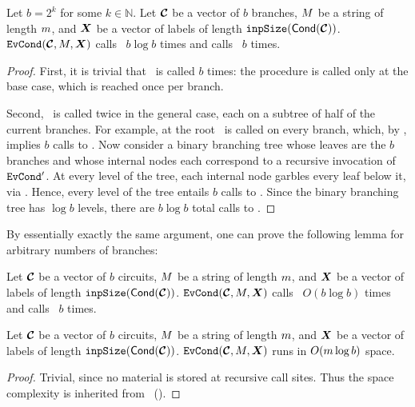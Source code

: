 \begin{lemma}\label{lemma:evcondtime}
  Let $b = 2^k$ for some $k \in \mathbb{N}$.
  Let $\vec{\cir}$ be a vector of $b$ branches, $M$ be a string of
  length $m$, and $\gcirinp$ be a vector of labels of length
  $\inpsize(\conditional(\vec{\cir}))$.
  $\evcond(\vec{\cir}, \mat, \gcirinp)$ calls \gGb\ $b \log b$ times
  and calls \gEv\ $b$ times.
\end{lemma}
\begin{proof}
  First, it is trivial that \gEv\ is called $b$ times: the
  procedure is called only at the base case, which is reached once per
  branch.

  Second, \gbtree\ is called twice in the general case, each on a
  subtree of half of the current branches.
  For example, at the root \gbtree\ is called on every branch, which, by
  , implies $b$ calls to \Gb.
  Now consider a binary branching tree whose leaves are the $b$
  branches and whose internal nodes each correspond to
  a recursive invocation of $\mathtt{EvCond}'$.
  At every level of the tree, each internal node garbles every
  leaf below it, via \gbtree.
  Hence, every level of the tree entails $b$ calls to \Gb.
  Since the binary branching tree has $\log b$ levels, there are $b
  \log b$ total calls to \Gb.
\end{proof}

By essentially exactly the same argument, one can prove the following
lemma for arbitrary numbers of branches:
\begin{lemma}\label{lemma:evcondtime-general}
  Let $\vec{\cir}$ be a vector of $b$ circuits, $M$ be a string of
  length $m$, and $\gcirinp$ be a vector of labels of length
  $\inpsize(\conditional(\vec{\cir}))$.
  $\evcond(\vec{\cir}, \mat, \gcirinp)$ calls \gGb\ $O(b \log b)$ times
  and calls \gEv\ $b$ times.
\end{lemma}

\begin{lemma}\label{lemma:evcondspace}
  Let $\vec{\cir}$ be a vector of $b$ circuits, $M$ be a string of
  length $m$, and $\gcirinp$ be a vector of labels of length
  $\inpsize(\conditional(\vec{\cir}))$.
  $\evcond(\vec{\cir}, \mat, \gcirinp)$ runs in $O(m \log b)$ space.
\end{lemma}
\begin{proof}
  Trivial, since no material is stored at recursive call sites.
  Thus the space complexity is inherited from
  \gbtree~().
\end{proof}


